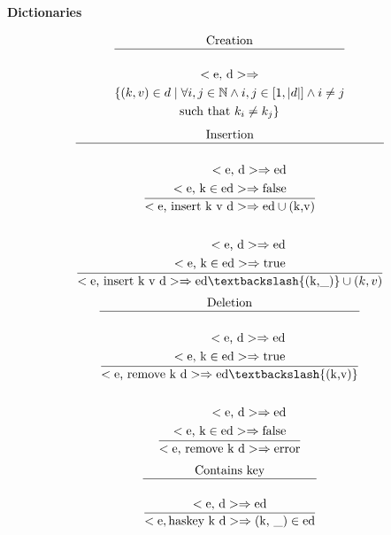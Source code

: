 \documentclass[a4paper, 10pt]{article}
\newcommand{\te}[1]{\text{#1}}
\def\N{\mathbb{N}}
\DeclarePairedDelimiter\abs{\lvert}{\rvert}
\theoremstyle{plain}%
\theoremstyle{definition}
\theoremstyle{remark}
\begin{document}
\textbf{Dictionaries}

\begin{gather*}
	\te{Creation} \\
	\hline \\
	<\te{e, d}> \Rightarrow \\ \{ (k,v) \in d \mid \forall i,j \in \N \wedge i,j \in \left[1, \abs{d}\right] \land i \neq j \\ \text{such that } k_i \neq k_j \}
\end{gather*}
\begin{gather*}
	\te{Insertion} \\
	\hline \\
	\dfrac{ \begin{aligned}
		<\te{e, d}> \Rightarrow \te{ed} \\
		<\te{e, k} \in \te{ed}> \Rightarrow \te{false} \\
	\end{aligned} }{<\te{e, insert k v d}> \Rightarrow \te{ed} \cup (\te{k,v})} \\ \\
	\dfrac{ \begin{aligned}
		<\te{e, d}> \Rightarrow \te{ed} \\
		<\te{e, k} \in \te{ed}> \Rightarrow \te{true}
	\end{aligned}}{<\te{e, insert k v d}> \Rightarrow \te{ed} \textbackslash \{(\te{k,\_})\} \cup (k, v) }
\end{gather*}
\begin{gather*}
	\te{Deletion} \\ \hline \\
	\dfrac{	\begin{aligned}
		<\te{e, d}> \Rightarrow \te{ed} \\
		<\te{e, k} \in \te{ed}> \Rightarrow \te{true}
	\end{aligned}}{<\te{e, remove k d}> \Rightarrow \te{ed} \textbackslash \{(\te{k,v})\}} \\ \\
	\dfrac{	\begin{aligned}
		<\te{e, d}> \Rightarrow \te{ed} \\
		<\te{e, k} \in \te{ed}> \Rightarrow \te{false}
	\end{aligned}}{<\te{e, remove k d}> \Rightarrow \te{error}}
\end{gather*}
\begin{gather*}
	\te{Contains key} \\ \hline \\
	\dfrac{<\te{e, d}> \Rightarrow \te{ed}}{<\te{e}, \te{haskey k d}> \Rightarrow (\te{k, \_}) \in \te{ed}}
\end{gather*}
\end{document}

